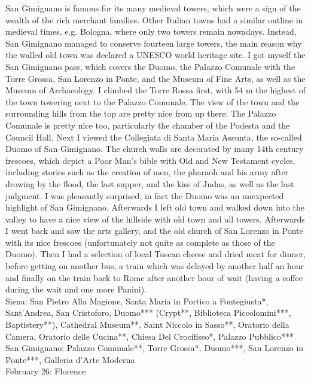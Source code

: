 San Gimignano is famous for its many medieval towers, which were a sign of the wealth of the rich merchant families. Other Italian towns had a similar outline in medieval times, e.g. Bologna, where only two towers remain nowadays. Instead, San Gimignano managed to conserve fourteen large towers, the main reason why the walled old town was declared a UNESCO world heritage site. I got myself the San Gimignano pass, which covers the Duomo, the Palazzo Comunale with the Torre Grossa, San Lorenzo in Ponte, and the Museum of Fine Arts, as well as the Museum of Archaeology. I climbed the Torre Rossa first, with 54 m the highest of the town towering next to the Palazzo Comunale. The view of the town and the surrounding hills from the top are pretty nice from up there. The Palazzo Comunale is pretty nice too, particularly the chamber of the Podesta and the Council Hall. Next I viewed the Collegiata di Santa Maria Assunta, the so-called Duomo of San Gimignano. The church walls are decorated by many 14th century frescoes, which depict a Poor Man's bible with Old and New Testament cycles, including stories such as the creation of men, the pharaoh and his army after drowing by the flood, the last supper, and the kiss of Judas, as well as the last judgment. I was pleasantly surprised, in fact the Duomo was an unexpected highlight of San Gimignano. Afterwards I left old town and walked down into the valley to have a nice view of the hillside with old town and all towers. Afterwards I went back and saw the arts gallery, and the old church of San Lorenzo in Ponte with its nice frescoes (unfortunately not quite as complete as those of the Duomo). Then I had a selection of local Tuscan cheese and dried meat for dinner, before getting on another bus, a train which was delayed by another half an hour and finally on the train back to Rome after another hour of wait (having a coffee during the wait and one more Panini).\\

Siena: San Pietro Alla Magione, Santa Maria in Portico a Fontegiusta*,  Sant'Andrea, San Cristoforo, Duomo*** (Crypt**, Biblioteca Piccolomini***, Baptistery**), Cathedral Museum**, Saint Niccolo in Sasso**, Oratorio della Camera, Oratorio delle Cucina**, Chiesa Del Crocifisso*, Palazzo Pubblico***\\%
San Gimignano: Palazzo Comunale**, Torre Grossa*, Duomo***, San Lorenzo in Ponte***, Galleria d'Arte Moderna\\%

February 26: Florence\\%

